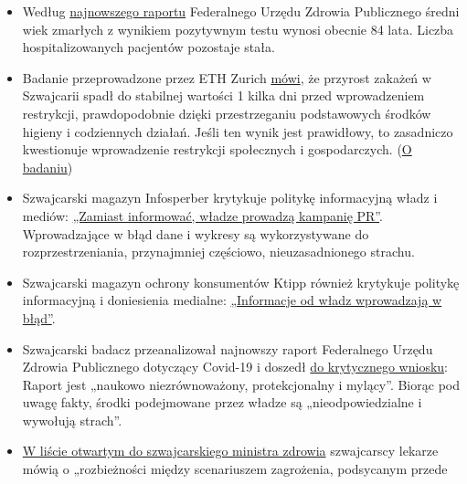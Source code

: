 \begin{itemize}
\tightlist
\item
  Według
  \href{https://www.bag.admin.ch/bag/de/home/krankheiten/ausbrueche-epidemien-pandemien/aktuelle-ausbrueche-epidemien/novel-cov/situation-schweiz-und-international.html}{najnowszego
  raportu} Federalnego Urzędu Zdrowia Publicznego średni wiek zmarłych z
  wynikiem pozytywnym testu wynosi obecnie 84 lata. Liczba
  hospitalizowanych pacjentów pozostaje stała.
\item
  Badanie przeprowadzone przez ETH Zurich
  \href{https://www.tagesanzeiger.ch/ansteckungsraten-flachten-bereits-vor-dem-lockdown-ab-809893127675}{mówi},
  że przyrost zakażeń w Szwajcarii spadł do stabilnej wartości 1 kilka
  dni przed wprowadzeniem restrykcji, prawdopodobnie dzięki
  przestrzeganiu podstawowych środków higieny i codziennych działań.
  Jeśli ten wynik jest prawidłowy, to zasadniczo kwestionuje
  wprowadzenie restrykcji społecznych i gospodarczych.
  (\href{https://bsse.ethz.ch/cevo/research/sars-cov-2/real-time-monitoring-in-switzerland.html}{O
  badaniu})
\item
  Szwajcarski magazyn Infosperber krytykuje politykę informacyjną władz
  i mediów:
  \href{https://www.infosperber.ch/Artikel/Gesundheit/Corona-Statt-zu-informieren-fuhren-Behorden-eine-PR-Kampagne}{„Zamiast
  informować, władze prowadzą kampanię PR''}. Wprowadzające w błąd dane
  i wykresy są wykorzystywane do rozprzestrzeniania, przynajmniej
  częściowo, nieuzasadnionego strachu.
\item
  Szwajcarski magazyn ochrony konsumentów Ktipp również krytykuje
  politykę informacyjną i doniesienia medialne:
  \href{https://www.ktipp.ch/artikel/artikeldetail/behoerden-informieren-irrefuehrend/}{„}\href{https://www.ktipp.ch/artikel/artikeldetail/behoerden-informieren-irrefuehrend/}{Informacje
  od władz wprowadzają w błąd''}.
\item
  Szwajcarski badacz przeanalizował najnowszy raport Federalnego Urzędu
  Zdrowia Publicznego dotyczący Covid-19 i doszedł
  \href{https://covid-19-fakten.blogspot.com/2020/04/die-analyse-des-aktuellen.html}{do
  krytycznego wniosku}: Raport jest „naukowo niezrównoważony,
  protekcjonalny i mylący''. Biorąc pod uwagę fakty, środki podejmowane
  przez władze są „nieodpowiedzialne i wywołują strach''.
\item
  \href{https://www.rontalpraxis.ch/aktuelles}{W liście otwartym do
  szwajcarskiego ministra zdrowia} szwajcarscy lekarze mówią o
  „rozbieżności między scenariuszem zagrożenia, podsycanym przede

\end{itemize}
